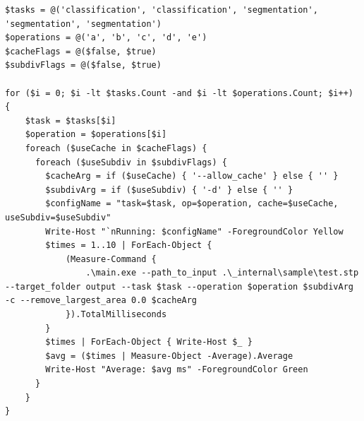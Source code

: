 \begin{lstlisting}
$tasks = @('classification', 'classification', 'segmentation', 'segmentation', 'segmentation')
$operations = @('a', 'b', 'c', 'd', 'e')
$cacheFlags = @($false, $true)
$subdivFlags = @($false, $true)

for ($i = 0; $i -lt $tasks.Count -and $i -lt $operations.Count; $i++) {
    $task = $tasks[$i]
    $operation = $operations[$i]
    foreach ($useCache in $cacheFlags) {
      foreach ($useSubdiv in $subdivFlags) {
        $cacheArg = if ($useCache) { '--allow_cache' } else { '' }
        $subdivArg = if ($useSubdiv) { '-d' } else { '' }
        $configName = "task=$task, op=$operation, cache=$useCache, useSubdiv=$useSubdiv"
        Write-Host "`nRunning: $configName" -ForegroundColor Yellow
        $times = 1..10 | ForEach-Object {
            (Measure-Command {
                .\main.exe --path_to_input .\_internal\sample\test.stp --target_folder output --task $task --operation $operation $subdivArg -c --remove_largest_area 0.0 $cacheArg
            }).TotalMilliseconds
        }
        $times | ForEach-Object { Write-Host $_ }
        $avg = ($times | Measure-Object -Average).Average
        Write-Host "Average: $avg ms" -ForegroundColor Green
      }
    }
}
\end{lstlisting}

